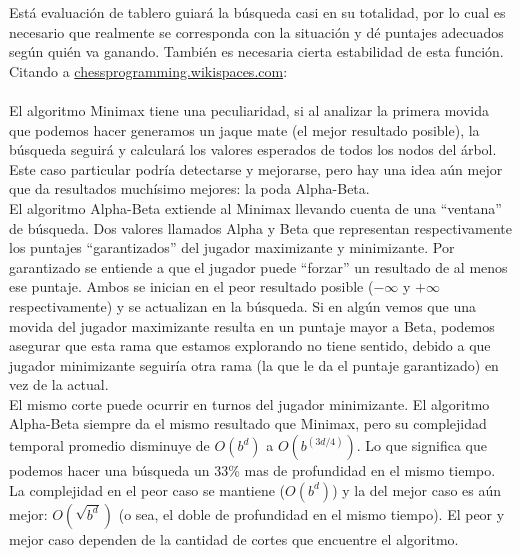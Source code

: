 \documentclass{article}
\begin{document}
Está evaluación de tablero guiará la búsqueda casi en su
totalidad, por lo cual es necesario que realmente se corresponda con
la situación y dé puntajes adecuados según quién va ganando.
También es necesaria cierta estabilidad de esta función. Citando a
\href{http://chessprogramming.wikispaces.com/}{chessprogramming.wikispaces.com}:
\\

\noindent
{}
\\

El algoritmo Minimax tiene una peculiaridad, si al analizar la primera
movida que podemos hacer generamos un jaque mate (el mejor resultado
posible), la búsqueda seguirá y calculará los valores esperados de
todos los nodos del árbol. Este caso particular podría detectarse y
mejorarse, pero hay una idea aún mejor que da resultados muchísimo
mejores: la poda Alpha-Beta.
\\

El algoritmo Alpha-Beta extiende al Minimax llevando cuenta de una
``ventana'' de búsqueda. Dos valores llamados Alpha y Beta que
representan respectivamente los puntajes ``garantizados'' del jugador
maximizante y minimizante. Por garantizado se entiende a que el jugador
puede ``forzar'' un resultado de al menos ese puntaje. Ambos se inician
en el peor resultado posible ($-\infty$ y $+\infty$ respectivamente)
y se actualizan en la búsqueda. Si en algún vemos que una movida
del jugador maximizante resulta en un puntaje mayor a Beta, podemos
asegurar que esta rama que estamos explorando no tiene sentido, debido
a que jugador minimizante seguiría otra rama (la que le da el puntaje
garantizado) en vez de la actual.
\\

El mismo corte puede ocurrir en turnos del jugador minimizante. El
algoritmo Alpha-Beta siempre da el mismo resultado que Minimax,
pero su complejidad temporal promedio disminuye de $O(b^d)$ a
$O(b^{(3d/4)})$\footnotemark. Lo que significa que podemos hacer una
búsqueda un 33\% mas de profundidad en el mismo tiempo. La complejidad
en el peor caso se mantiene ($O(b^d)$) y la del mejor caso es aún
mejor: $O(\sqrt{b^d})$ (o sea, el doble de profundidad en el mismo
tiempo). El peor y mejor caso dependen de la cantidad de cortes que
encuentre el algoritmo.
\\
\end{document}
